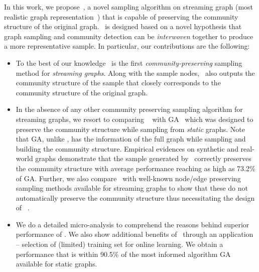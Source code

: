  In this work, we propose~\compas, a novel sampling algorithm on streaming graph (most realistic graph representation~\cite{aggarwal2011outlier,ahmed2014network}) that is capable of
 preserving 
 the community structure of the original graph. 
\compas~is designed based on a novel hypothesis that  graph sampling and community detection can be \textit{interwoven} together %
 to produce a more representative sample. In particular, our contributions are the following: 
\begin{itemize}
\item To the best of our knowledge \compas~is the first {\em community-preserving} sampling method for {\em streaming graphs}. Along with the sample nodes, \compas~also outputs the community structure of the sample that closely corresponds to the community structure of the original graph.

\item In the absence of any other community preserving sampling algorithm for streaming graphs, we resort to comparing \compas~ with GA~\cite{tong2016novel} which was designed to preserve the community structure while sampling from \textit{static} graphs. Note that GA, unlike \compas, has the information of the full graph while sampling and building the community structure. Empirical evidences on synthetic and real-world graphs demonstrate that the sample generated by \compas~correctly preserves the community structure 
with average performance reaching as high as 73.2\% of GA. Further, we also compare \compas~with well-known node/edge preserving sampling methods available for streaming graphs to show that these do not automatically preserve the community structure thus necessitating the design of \compas~. 

\item We  do a detailed micro-analysis to comprehend the reasons behind superior performance of \compas.
We also show additional benefits of \compas~through an application -- 
 selection of (limited) training set for online learning. We obtain a performance that is within \iffalse 95.6\% and\fi 90.5\% of the most informed algorithm GA available for static graphs. %

 \iffalse for first and second applications respectively.\fi
\end{itemize}









